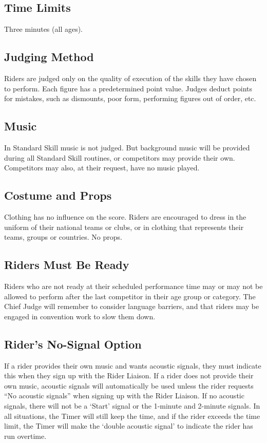 \subsection{Time Limits}
Three minutes (all ages).

\subsection{Judging Method}
Riders are judged only on the quality of execution of the skills they have chosen to perform.
Each figure has a predetermined point value.
Judges deduct points for mistakes, such as dismounts, poor form, performing figures out of order, etc.

\subsection{Music}

In Standard Skill music is not judged.
But background music will be provided during all Standard Skill routines, or competitors may provide their own.
Competitors may also, at their request, have no music played.

\subsection{Costume and Props}
Clothing has no influence on the score.
Riders are encouraged to dress in the uniform of their national teams or clubs, or in clothing that represents their teams, groups or countries.
No props.

\subsection{Riders Must Be Ready}
Riders who are not ready at their scheduled performance time may or may not be allowed to perform after the last competitor in their age group or category.
The Chief Judge will remember to consider language barriers, and that riders may be engaged in convention work to slow them down.

\subsection{Rider's No-Signal Option \label{sec:freestyle_riders-no-signal-option}}
If a rider provides their own music and wants acoustic signals, they must indicate this when they sign up with the Rider Liaison.
If a rider does not provide their own music, acoustic signals will automatically be used unless the rider requests ``No acoustic signals'' when signing up with the Rider Liaison.
If no acoustic signals, there will not be a `Start' signal or the 1-minute and 2-minute signals.
In all situations, the Timer will still keep the time, and if the rider exceeds the time limit, the Timer will make the `double acoustic signal' to indicate the rider has run overtime.

